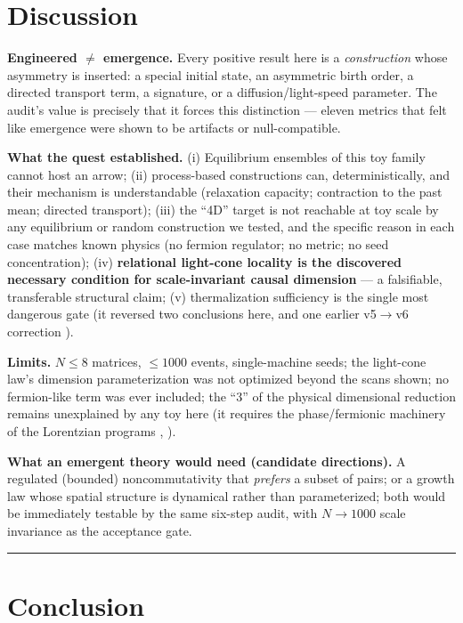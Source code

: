 \documentclass[12pt,a4paper]{article}
\begin{document}
\section{Discussion}\label{discussion}

\textbf{Engineered \(\ne\) emergence.} Every positive result here is a
\emph{construction} whose asymmetry is inserted: a special initial
state, an asymmetric birth order, a directed transport term, a
signature, or a diffusion/light-speed parameter. The audit's value is
precisely that it forces this distinction --- eleven metrics that felt
like emergence were shown to be artifacts or null-compatible.

\textbf{What the quest established.} (i) Equilibrium ensembles of this
toy family cannot host an arrow; (ii) process-based constructions can,
deterministically, and their mechanism is understandable (relaxation
capacity; contraction to the past mean; directed transport); (iii) the
``4D'' target is not reachable at toy scale by any equilibrium or random
construction we tested, and the specific reason in each case matches
known physics (no fermion regulator; no metric; no seed concentration);
(iv) \textbf{relational light-cone locality is the discovered necessary
condition for scale-invariant causal dimension} --- a falsifiable,
transferable structural claim; (v) thermalization sufficiency is the
single most dangerous gate (it reversed two conclusions here, and one
earlier v5$\rightarrow$v6 correction \cite{chanpengpad_sgoed_v2}).

\textbf{Limits.} \(N\le8\) matrices, \(\le1000\) events, single-machine
seeds; the light-cone law's dimension parameterization was not optimized
beyond the scans shown; no fermion-like term was ever included; the
``3'' of the physical dimensional reduction remains unexplained by any
toy here (it requires the phase/fermionic machinery of the Lorentzian
programs \cite{kim_nishimura_2011}, \cite{kim_nishimura_2012}).

\textbf{What an emergent theory would need (candidate directions).} A
regulated (bounded) noncommutativity that \emph{prefers} a subset of
pairs; or a growth law whose spatial structure is dynamical rather than
parameterized; both would be immediately testable by the same six-step
audit, with \(N\to1000\) scale invariance as the acceptance gate.

\begin{center}\rule{0.5\linewidth}{0.5pt}\end{center}

\section{Conclusion}\label{conclusion}
\end{document}
